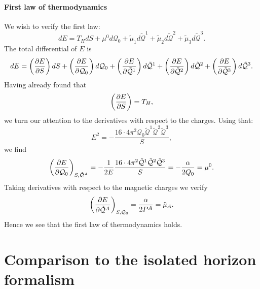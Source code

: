 \paragraph{First law of thermodynamics} 
We wish to verify the first law:
\begin{equation*}
    dE = T_HdS + \mu^0 d\mathcal{Q}_0 + \tilde{\mu}_1 d\tilde{\mathcal{Q}}^1 + \tilde{\mu}_2 d\tilde{\mathcal{Q}}^2 + \tilde{\mu}_3 d\tilde{\mathcal{Q}}^3.
\end{equation*}
The total differential of $E$ is
\begin{equation*}
    dE = \left(\frac{\partial E}{\partial S} \right)dS + \left(\frac{\partial E}{\partial \mathcal{Q}_0} \right) d\mathcal{Q}_0 + \left(\frac{\partial E}{\partial \tilde{\mathcal{Q}}^1} \right) d\tilde{\mathcal{Q}}^1 + \left(\frac{\partial E}{\partial \tilde{\mathcal{Q}}^2}\right) d\tilde{\mathcal{Q}}^2 + \left(\frac{\partial E}{\partial \tilde{\mathcal{Q}}^3} \right) d\tilde{\mathcal{Q}}^3.
\end{equation*}
Having already found that
\begin{equation*}
    \left(\frac{\partial E}{\partial S} \right) = T_H,
\end{equation*}
we turn our attention to the derivatives with respect to the charges. Using that:
\begin{equation*}
    E^2 = - \frac{16\cdot 4\pi^2 \mathcal{Q}_0 \tilde{\mathcal{Q}}^1 \tilde{\mathcal{Q}}^2 \tilde{\mathcal{Q}}^3}{S},
\end{equation*}
we find
\begin{equation*}
        \left(\frac{\partial E}{\partial \mathcal{Q}_0} \right)_{S,\tilde{\mathcal{Q}}^A} = -\frac{1}{2E} \frac{16\cdot 4\pi^2 \tilde{\mathcal{Q}}^1 \tilde{\mathcal{Q}}^2 \tilde{\mathcal{Q}}^3}{S} = -\frac{\alpha}{2Q_0} = \mu^0.
\end{equation*}
Taking derivatives with respect to the magnetic charges we verify
\begin{equation*}
    \left(\frac{\partial E}{\partial \tilde{\mathcal{Q}}^A} \right)_{S,\mathcal{Q}_0} = \frac{\alpha}{2P^A} = \tilde{\mu}_A.
\end{equation*}
Hence we see that the first law of thermodynamics holds.

\section{Comparison to the isolated horizon formalism}
\label{sec:Isolated_horionzs}

